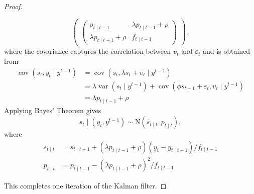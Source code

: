 \documentclass[oneside,reqno]{amsart}
\DeclareMathOperator{\var}{var}
\DeclareMathOperator{\cov}{cov}
\newcommand{\eps}{\varepsilon}
\newcommand{\ups}{\upsilon}
\newcommand{\N}{\mathrm N}
\theoremstyle{definition}
\begin{document}
\begin{enumerate}
\begin{proof}
\begin{enumerate}[label=(\arabic*)]
\[\begin{pmatrix}
		\begin{pmatrix}
			p_{t \mid t-1} & \lambda p_{t \mid t-1} + \rho \\
			\lambda p_{t \mid t-1} + \rho & f_{t \mid t-1}
		\end{pmatrix}
	\end{pmatrix},
\]
where the covariance captures the correlation between $\ups_t$ and $\eps_t$ and is obtained from
\begin{align*}
	\cov(s_t, y_t \mid y^{t-1}) &= \cov(s_t, \lambda s_t + \ups_t \mid y^{t-1}) \\
	&= \lambda \var(s_t\mid y^{t-1}) + \cov(\phi s_{t-1} + \eps_t, \ups_t\mid y^{t-1}) \\
	&= \lambda p_{t \mid t-1} + \rho 
\end{align*}
Applying Bayes' Theorem gives 
\[
	s_t \mid (y_t, y^{t-1}) \sim \N(\bar s_{t\mid t}, p_{t\mid t}),
\]
where 
\begin{align*}
	\bar s_{t\mid t} &= \bar s_{t\mid t-1} + (\lambda p_{t \mid t-1} + \rho) (y_t - \bar y_{t\mid t-1})/ f_{t \mid t-1} \\
	p_{t \mid t} &= p_{t \mid t-1} -  (\lambda p_{t \mid t-1} + \rho)^2 / f_{t \mid t-1}
\end{align*}
\end{enumerate}
This completes one iteration of the Kalman filter.
\end{proof}

\end{enumerate}
\end{document}
